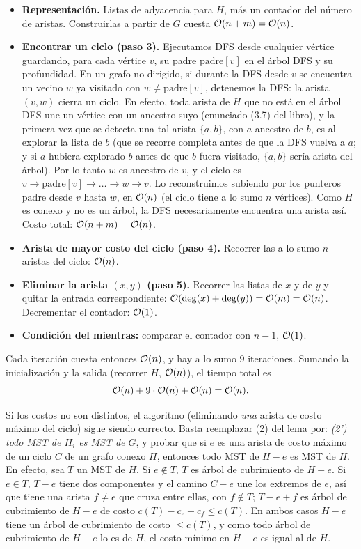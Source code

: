 \begin{itemize}
\item \textbf{Representación.} Listas de adyacencia para $H$, más un contador del número de aristas. Construirlas a partir de $G$ cuesta $\mathcal{O}(n+m)=\mathcal{O}(n)$.
\item \textbf{Encontrar un ciclo (paso 3).} Ejecutamos DFS desde cualquier vértice guardando, para cada vértice $v$, su padre $\mathrm{padre}[v]$ en el árbol DFS y su profundidad. En un grafo no dirigido, si durante la DFS desde $v$ se encuentra un vecino $w$ ya visitado con $w\neq \mathrm{padre}[v]$, detenemos la DFS: la arista $(v,w)$ cierra un ciclo. En efecto, toda arista de $H$ que no está en el árbol DFS une un vértice con un ancestro suyo (enunciado (3.7) del libro), y la primera vez que se detecta una tal arista $\{a,b\}$, con $a$ ancestro de $b$, es al explorar la lista de $b$ (que se recorre completa antes de que la DFS vuelva a $a$; y si $a$ hubiera explorado $b$ antes de que $b$ fuera visitado, $\{a,b\}$ sería arista del árbol). Por lo tanto $w$ es ancestro de $v$, y el ciclo es $v\to\mathrm{padre}[v]\to\dots\to w\to v$. Lo reconstruimos subiendo por los punteros $\mathrm{padre}$ desde $v$ hasta $w$, en $\mathcal{O}(n)$ (el ciclo tiene a lo sumo $n$ vértices). Como $H$ es conexo y no es un árbol, la DFS necesariamente encuentra una arista así. Costo total: $\mathcal{O}(n+m)=\mathcal{O}(n)$.
\item \textbf{Arista de mayor costo del ciclo (paso 4).} Recorrer las a lo sumo $n$ aristas del ciclo: $\mathcal{O}(n)$.
\item \textbf{Eliminar la arista $(x,y)$ (paso 5).} Recorrer las listas de $x$ y de $y$ y quitar la entrada correspondiente: $\mathcal{O}(\deg(x)+\deg(y))=\mathcal{O}(m)=\mathcal{O}(n)$. Decrementar el contador: $\mathcal{O}(1)$.
\item \textbf{Condición del \textbf{mientras}:} comparar el contador con $n-1$, $\mathcal{O}(1)$.
\end{itemize}

Cada iteración cuesta entonces $\mathcal{O}(n)$, y hay a lo sumo $9$ iteraciones. Sumando la inicialización y la salida (recorrer $H$, $\mathcal{O}(n)$), el tiempo total es
\[ \mathcal{O}(n) + 9\cdot \mathcal{O}(n) + \mathcal{O}(n) = \mathcal{O}(n). \]

\begin{observacion}
Si los costos no son distintos, el algoritmo (eliminando \emph{una} arista de costo máximo del ciclo) sigue siendo correcto. Basta reemplazar (2) del lema por: \emph{(2') todo MST de $H_{i}$ es MST de $G$}, y probar que si $e$ es una arista de costo máximo de un ciclo $C$ de un grafo conexo $H$, entonces todo MST de $H-e$ es MST de $H$. En efecto, sea $T$ un MST de $H$. Si $e\notin T$, $T$ es árbol de cubrimiento de $H-e$. Si $e\in T$, $T-e$ tiene dos componentes y el camino $C-e$ une los extremos de $e$, así que tiene una arista $f\neq e$ que cruza entre ellas, con $f\notin T$; $T-e+f$ es árbol de cubrimiento de $H-e$ de costo $c(T)-c_e+c_f\le c(T)$. En ambos casos $H-e$ tiene un árbol de cubrimiento de costo $\le c(T)$, y como todo árbol de cubrimiento de $H-e$ lo es de $H$, el costo mínimo en $H-e$ es igual al de $H$.
\end{observacion}

